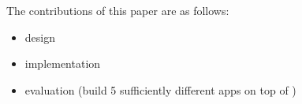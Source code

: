 

The contributions of this paper are as follows: 
\begin{itemize}
\item \name design
\item \name implementation
\item \name evaluation (build 5 sufficiently different apps on top of \name)
\end{itemize}
